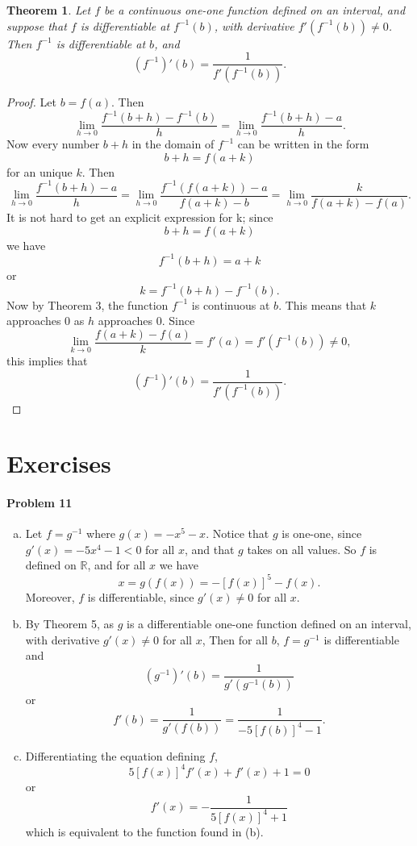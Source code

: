 \documentclass{article}
\newtheorem{theorem}{Theorem}
\begin{document}
\begin{theorem}
  Let $f$ be a continuous one-one function defined on an interval, and suppose
  that $f$ is differentiable at $f^{-1}(b)$, with derivative $f'(f^{-1}(b))
  \neq 0$. Then $f^{-1}$ is differentiable at $b$, and \[
    (f^{-1})'(b) = \frac{1}{f'(f^{-1}(b))}.
  \]
\end{theorem}
\begin{proof}
  Let $b = f(a)$. Then \[
    \lim_{h \to 0} \frac{f^{-1}(b + h) - f^{-1}(b)}{h}
    = \lim_{h \to 0} \frac{f^{-1}(b + h) - a}{h}.
  \] Now every number $b + h$ in the domain of $f^{-1}$ can be written in the
  form \[
    b + h = f(a + k)
  \] for an unique $k$. Then \[
    \lim_{h \to 0} \frac{f^{-1}(b + h) - a}{h}
    = \lim_{h \to 0} \frac{f^{-1}(f(a + k)) - a}{f(a + k) - b}
    = \lim_{h \to 0} \frac{k}{f(a + k) - f(a)}.
  \] It is not hard to get an explicit expression for k; since \[
    b + h = f(a + k)
  \] we have \[
    f^{-1}(b + h) = a + k
  \] or \[
    k = f^{-1}(b + h) - f^{-1}(b).
  \] Now by Theorem 3, the function $f^{-1}$ is continuous at $b$. This means
  that $k$ approaches 0 as $h$ approaches 0. Since \[
    \lim_{k \to 0} \frac{f(a + k) - f(a)}{k} = f'(a) = f'(f^{-1}(b)) \neq 0,
  \] this implies that \[
    (f^{-1})'(b) = \frac{1}{f'(f^{-1}(b))}.
  \]
\end{proof}

\section*{Exercises}

\paragraph{Problem 11}
\begin{enumerate}[(a)]
  \item Let $f = g^{-1}$ where $g(x) = -x^5 - x$. Notice that $g$ is one-one,
    since $g'(x) = -5x^4 - 1 < 0$ for all $x$, and that $g$ takes on all
    values. So $f$ is defined on $\mathbb{R}$, and for all $x$ we have \[
      x = g(f(x)) = -[f(x)]^5 - f(x).
    \] Moreover, $f$ is differentiable, since $g'(x) \neq 0$ for all $x$.
  \item By Theorem 5, as $g$ is a differentiable one-one function defined on an
    interval, with derivative $g'(x) \neq 0$ for all $x$, Then for all $b$, $f
    = g^{-1}$ is differentiable and \[
      (g^{-1})'(b) = \frac{1}{g'(g^{-1}(b))}
    \] or \[
      f'(b) = \frac{1}{g'(f(b))} = \frac{1}{-5[f(b)]^4 - 1}.
    \]
  \item Differentiating the equation defining $f$, \[
      5[f(x)]^4f'(x) + f'(x) + 1 = 0
    \] or \[
      f'(x) = -\frac{1}{5[f(x)]^4 + 1}
    \] which is equivalent to the function found in (b).
\end{enumerate}
\end{document}
